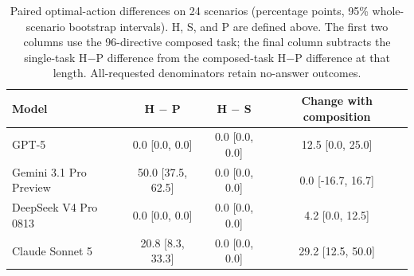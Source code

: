 \begin{table}[htbp]
\centering
\small
\caption{Paired optimal-action differences on 24 scenarios (percentage points, 95\% whole-scenario bootstrap intervals). H, S, and P are defined above. The first two columns use the 96-directive composed task; the final column subtracts the single-task H$-$P difference from the composed-task H$-$P difference at that length. All-requested denominators retain no-answer outcomes.}
\label{tab:decision-paired}
\begin{tabular}{@{}lccc@{}}
\toprule
Model & H $-$ P & H $-$ S & Change with composition \\
\midrule
GPT-5 & 0.0 [0.0, 0.0] & 0.0 [0.0, 0.0] & 12.5 [0.0, 25.0] \\
Gemini 3.1 Pro Preview & 50.0 [37.5, 62.5] & 0.0 [0.0, 0.0] & 0.0 [-16.7, 16.7] \\
DeepSeek V4 Pro 0813 & 0.0 [0.0, 0.0] & 0.0 [0.0, 0.0] & 4.2 [0.0, 12.5] \\
Claude Sonnet 5 & 20.8 [8.3, 33.3] & 0.0 [0.0, 0.0] & 29.2 [12.5, 50.0] \\
\bottomrule
\end{tabular}
\end{table}
